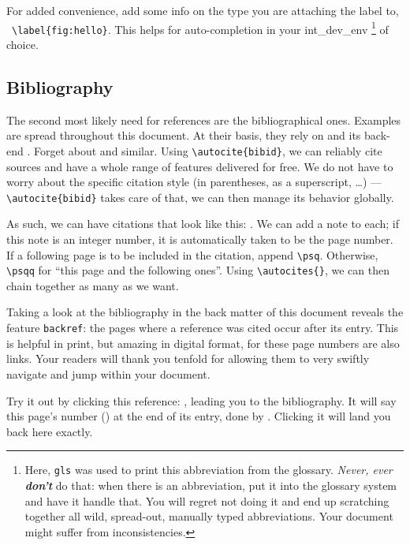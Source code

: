 For added convenience, add some info on the type you are attaching the label to, \ \verb|\label{fig:hello}|.
This helps for auto-completion in your \gls{int_dev_env}%
\footnote{%
	Here, \texttt{gls} was used to print this abbreviation from the glossary.
	\textit{Never, ever \textbf{don't}} do that: when there is an abbreviation, put it into the glossary system and have it handle that.
	You will regret not doing it and end up scratching together all wild, spread-out, manually typed abbreviations.
	Your document might suffer from inconsistencies.}
of choice.

\subsection{Bibliography}
The second most likely need for references are the bibliographical ones.
Examples are spread throughout this document.
At their basis, they rely on  and its back-end .
Forget about  and similar.
Using \verb|\autocite{bibid}|, we can reliably cite sources and have a whole range of features delivered for free.
We do not have to worry about the specific citation style (in parentheses, as a superscript, \dots) --- \verb|\autocite{bibid}| takes care of that, we can then manage its behavior globally.

As such, we can have citations that look like this: \autocites[23]{dixon_fluid_2014}[29\psqq]{aungier_centrifugal_2000}[2-9]{japikse_assessment_1985}[89\psq]{kurzke_correlations_2011}{pampreen_jet-wake_1982}.
We can add a note to each; if this note is an integer number, it is automatically taken to be the page number.
If a following page is to be included in the citation, append \verb|\psq|.
Otherwise, \verb|\psqq| for \enquote{this page and the following ones}.
Using \verb|\autocites{}|, we can then chain together as many as we want.

Taking a look at the bibliography in the back matter of this document reveals the feature \verb|backref|: the pages where a reference was cited occur after its entry.
This is helpful in print, but amazing in digital format, for these page numbers are also links.
Your readers will thank you tenfold for allowing them to very swiftly navigate and jump within your document.

Try it out by clicking this reference: \autocite{braunling_flugzeugtriebwerke:_2015}, leading you to the bibliography.
\label{backref_example}
It will say this page's number () at the end of its entry, done by .
Clicking it will land you back here exactly.

